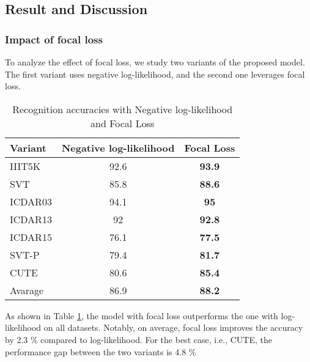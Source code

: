 \subsection{Result and Discussion}
\subsubsection{Impact of focal loss}
To analyze the effect of focal loss, we study two variants of the proposed model. The first variant uses negative log-likelihood, and the second one leverages focal loss. 
\begin{table}[h]
\centering
\caption{Recognition accuracies with Negative log-likelihood and Focal Loss}
\label{tab:loss}
\begin{tabular}{|l|cc|}
\hline
\textbf{Variant} & \textbf{Negative log-likelihood} & \textbf{Focal Loss} \\ \hline
IIIT5K  & 92.6     & \textbf{93.9}\\
SVT  & 85.8     & \textbf{88.6}\\
ICDAR03 & 94.1     & \textbf{95}\\
ICDAR13 & 92& \textbf{92.8}\\
ICDAR15 & 76.1     & \textbf{77.5}\\
SVT-P& 79.4     & \textbf{81.7}\\
CUTE & 80.6     & \textbf{85.4}\\ \hline
Avarage & 86.9 & \textbf{88.2}\\ \hline

\end{tabular}
\end{table}
\par As shown in Table \ref{tab:loss}, the model with focal loss outperforms the one with log-likelihood on all datasets. Notably, on average, focal loss improves the accuracy by 2.3 \% compared to log-likelihood. For the best case, i.e., CUTE, the performance gap between the two variants is 4.8 \%
